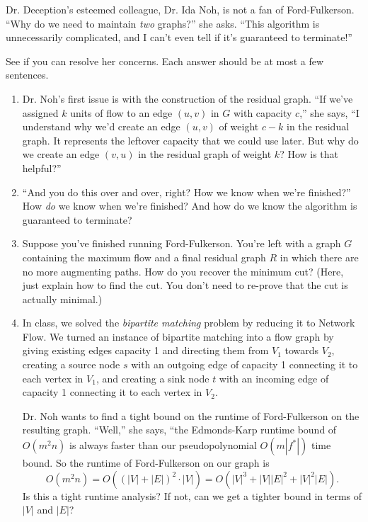 \documentclass[12 pt, letterpaper]{hmcpset}
\begin{document}
\begin{problem}
	Dr. Deception's esteemed colleague, Dr. Ida Noh, is not a fan of Ford-Fulkerson. ``Why do we need to maintain \emph{two} graphs?'' she asks. ``This algorithm is unnecessarily complicated, and I can't even tell if it's guaranteed to terminate!'' 

See if you can resolve her concerns. Each answer should be at most a few sentences.

\begin{enumerate}
    \item Dr. Noh's first issue is with the construction of the residual graph. ``If we've assigned $k$ units of flow to an edge $(u, v)$ in $G$ with capacity $c$,'' she says, ``I understand why we'd create an edge $(u, v)$ of weight $c - k$ in the residual graph. It represents the leftover capacity that we could use later. But why do we create an edge $(v, u)$ in the residual graph of weight $k$? How is that helpful?''

    \item ``And you do this over and over, right? How we know when we're finished?'' How \emph{do} we know when we're finished? And how do we know the algorithm is guaranteed to terminate?
    
    \item Suppose you've finished running Ford-Fulkerson. You're left with a graph $G$ containing the maximum flow and a final residual graph $R$ in which there are no more augmenting paths. How do you recover the minimum cut? (Here, just explain how to find the cut. You don't need to re-prove that the cut is actually minimal.)

    \item In class, we solved the \emph{bipartite matching} problem by reducing it to Network Flow. We turned an instance of bipartite matching into a flow graph by giving existing edges capacity 1 and directing them from $V_1$ towards $V_2$, creating a source node $s$ with an outgoing edge of capacity 1 connecting it to each vertex in $V_1$, and creating a sink node $t$ with an incoming edge of capacity 1 connecting it to each vertex in $V_2$.

    Dr. Noh wants to find a tight bound on the runtime of Ford-Fulkerson on the resulting graph. ``Well,'' she says, ``the Edmonds-Karp runtime bound of $O(m^2 n)$ is always faster than our pseudopolynomial $O(m |f^*|)$ time bound. So the runtime of Ford-Fulkerson on our graph is 
    \[
        O(m^2 n) = O( (|V|+|E|)^2 \cdot |V|) = O(|V|^3 + |V||E|^2 + |V|^2|E|).
    \]
    Is this a tight runtime analysis? If not, can we get a tighter bound in terms of $|V|$ and $|E|$?
\end{enumerate}
\end{problem}
\end{document}
